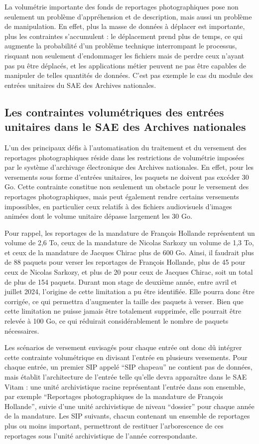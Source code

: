 La volumétrie importante des fonds de reportages photographiques pose non seulement un problème d'appréhension et de description, mais aussi un problème de manipulation. En effet, plus la masse de données à déplacer est importante, plus les contraintes s'accumulent : le déplacement prend plus de temps, ce qui augmente la probabilité d'un problème technique interrompant le processus, risquant non seulement d'endommager les fichiers mais de perdre ceux n'ayant pas pu être déplacés, et les applications métier peuvent ne pas être capables de manipuler de telles quantités de données. C'est pas exemple le cas du module des entrées unitaires du SAE des Archives nationales. 

\subsection*{Les contraintes volumétriques des entrées unitaires dans le SAE des Archives nationales}

L'un des principaux défis à l'automatisation du traitement et du versement des reportages photographiques réside dans les restrictions de volumétrie imposées par le système d'archivage électronique des Archives nationales. En effet, pour les versements sous forme d'entrées unitaires, les paquets ne doivent pas excéder 30 Go. Cette contrainte constitue non seulement un obstacle pour le versement des reportages photographiques, mais peut également rendre certains versements impossibles, en particulier ceux relatifs à des fichiers audiovisuels d'images animées dont le volume unitaire dépasse largement les 30 Go.

Pour rappel, les reportages de la mandature de François Hollande représentent un volume de 2,6 To, ceux de la mandature de Nicolas Sarkozy un volume de 1,3 To, et ceux de la mandature de Jacques Chirac plus de 600 Go. Ainsi, il faudrait plus de 88 paquets pour verser les reportages de François Hollande, plus de 45 pour ceux de Nicolas Sarkozy, et plus de 20 pour ceux de Jacques Chirac, soit un total de plus de 154 paquets. Durant mon stage de deuxième année, entre avril et juillet 2024, l'origine de cette limitation a pu être identifiée. Elle pourra donc être corrigée, ce qui permettra d'augmenter la taille des paquets à verser. Bien que cette limitation ne puisse jamais être totalement supprimée, elle pourrait être relevée à 100 Go, ce qui réduirait considérablement le nombre de paquets nécessaires.

Les scénarios de versement envisagés pour chaque entrée ont donc dû intégrer cette contrainte volumétrique en divisant l'entrée en plusieurs versements. Pour chaque entrée, un premier SIP appelé \enquote{SIP chapeau} ne contient pas de données, mais établit l'architecture de l'entrée telle qu'elle devra apparaître dans le SAE Vitam : une unité archivistique racine représentant l'entrée dans son ensemble, par exemple \enquote{Reportages photographiques de la mandature de François Hollande}, suivie d'une unité archivistique de niveau \enquote{dossier} pour chaque année de la mandature. Les SIP suivants, chacun contenant un ensemble de reportages plus ou moins important, permettront de restituer l'arborescence de ces reportages sous l'unité archivistique de l'année correspondante.

